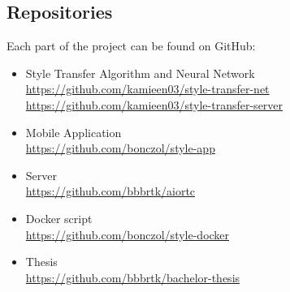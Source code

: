 \documentclass[../Main.tex]{subfiles}
\begin{document}
\newpage
\subsection{Repositories}

    Each part of the project can be found on GitHub:

    \begin{itemize}
        \item{
        Style Transfer Algorithm and Neural Network \\
        \url{https://github.com/kamieen03/style-transfer-net}\\
        \url{https://github.com/kamieen03/style-transfer-server}
        }
        \item{ 
        Mobile Application \\
        \url{https://github.com/bonczol/style-app}
            }
        \item {
        Server \\
        \url{https://github.com/bbbrtk/aiortc}
            }
        \item {
        Docker script \\
        \url{https://github.com/bonczol/style-docker}
            }
        \item {
        Thesis \\
        \url{https://github.com/bbbrtk/bachelor-thesis}
        }
    \end{itemize}
\biblio %
\end{document}
